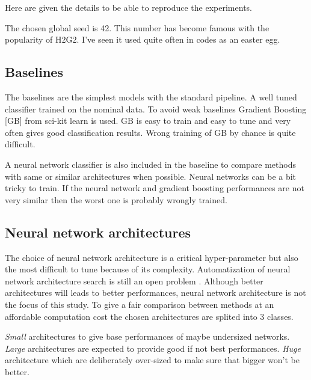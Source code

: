 Here are given the details to be able to reproduce the experiments.

The chosen global seed is 42.
This number has become famous with the popularity of H2G2\needcite.
I've seen it used quite often in codes as an easter egg.



\subsection{Baselines} %
\label{sub:baselines}

The baselines are the simplest models with the standard pipeline.
A well tuned classifier trained on the nominal data.
To avoid weak baselines Gradient Boosting [GB] \needcite from sci-kit learn is used.
GB is easy to train and easy to tune and very often gives good classification results.
Wrong training of GB by chance is quite difficult.

A neural network classifier is also included in the baseline to compare methods with same or similar architectures when possible.
Neural networks can be a bit tricky to train.
If the neural network and gradient boosting performances are not very similar then the worst one is probably wrongly trained.



\subsection{Neural network architectures} %
\label{sub:neural_network_architectures}


The choice of neural network architecture is a critical hyper-parameter but also the most difficult to tune because of its complexity.
Automatization of neural network architecture search is still an open problem \needcite.
Although better architectures will leads to better performances, neural network architecture is not the focus of this study.
To give a fair comparison between methods at an affordable computation cost the chosen architectures are splited into 3 classes.

\emph{Small} architectures to give base performances of maybe undersized networks.
\emph{Large} architectures are expected to provide good if not best performances.
\emph{Huge} architecture which are deliberately over-sized to make sure that bigger won't be better.


